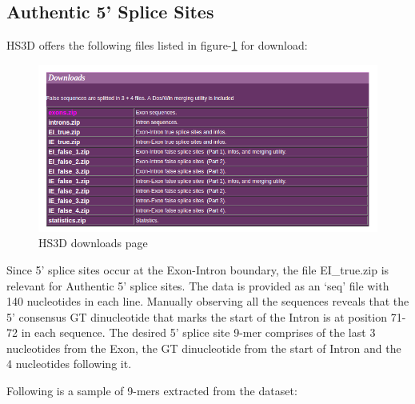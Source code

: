\documentclass[12pt,a4paper]{article}
\begin{document}
	\subsection{Authentic 5' Splice Sites}
	HS3D offers the following files listed in figure-\ref{fig:hs3d_download} for download:
   	\begin{figure}[H]
   		\includegraphics[width=\textwidth]{"hs3d_download"}
   		\caption{HS3D downloads page}
   		\centering
   		\label{fig:hs3d_download}
   	\end{figure}
	\par Since 5’ splice sites occur at the Exon-Intron boundary, the file EI\_true.zip is relevant for Authentic 5’ splice sites. The data is provided as an ‘seq’ file with 140 nucleotides in each line. Manually observing all the sequences reveals that the 5’ consensus GT dinucleotide that marks the start of the Intron is at position 71-72 in each sequence. The desired 5’ splice site 9-mer comprises of the last 3 nucleotides from the Exon, the GT dinucleotide from the start of Intron and the 4 nucleotides following it. \par
	Following is a sample of 9-mers extracted from the dataset:
	
\end{document}
